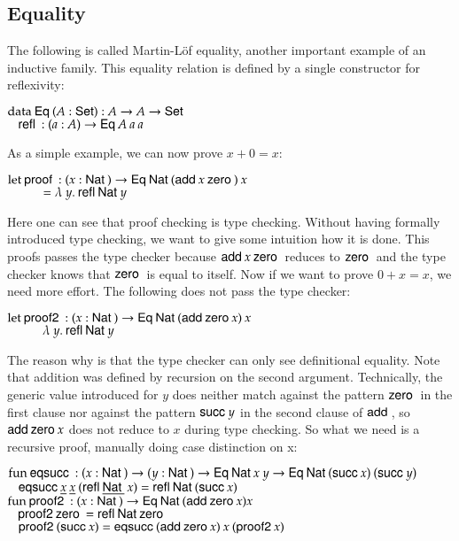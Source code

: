 \subsection{Equality}
The following is called Martin-L\"of equality, another important example of an inductive family.
This equality relation is defined by a single constructor for reflexivity:
\begin{bsp}
$\mathrm{data}\: \mathsf{Eq}\: ( A : \mathsf{Set} ) : A \rightarrow A \rightarrow \mathsf{Set} $ \\
$\hspace*{3mm} \mathsf{refl}\: : ( a : A ) \rightarrow{\mathsf{Eq}\:A \: a \: a}$
\end{bsp}
As a simple example, we can now prove $ x + 0 = x $:
\begin{bsp}
$ \mathrm{let}\: \mathsf{proof}\: : ( x : \mathsf{Nat}\: ) \rightarrow{\mathsf{Eq}\:\mathsf{Nat}\:(\mathsf{add}\:x \: \mathsf{zero}\:)\: x} $ \\ 
$ \spcx = \lam{y}\refl \Nat y$ 
\end{bsp}
Here one can see that proof checking is type checking.
Without having formally introduced type checking, we want to give some intuition how it is done.
This proofs passes the type checker because $\mathsf{add}\: x \: \mathsf{zero}\:$ reduces to $\mathsf{zero}\:$ and the type checker knows that $\mathsf{zero}\:$ is equal to itself.
Now if we want to prove $ 0 +  x = x $, we need more effort.
The following does not pass the type checker:
\begin{bsp}
$ \mathrm{let}\: \mathsf{proof2}\: : ( x : \mathsf{Nat}\: ) \rightarrow{\mathsf{Eq}\:\mathsf{Nat}\:(\mathsf{add}\:\mathsf{zero}\:x)\: x} $ \\ 
$ \spcx \lam{y} \refl \Nat y$ 
\end{bsp}
The reason why is that the type checker can only see definitional equality.
Note that addition was defined by recursion on the second argument.
Technically, the generic value introduced for $y$ does neither match against the pattern $\mathsf{zero}\:$ in the first clause
nor against the pattern $\mathsf{succ}\: y$ in the second clause of $\mathsf{add}\:$, so $\mathsf{add}\: \mathsf{zero}\: x$ does not reduce to $x$ during type checking.
So what we need is a recursive proof, manually doing case distinction on x:
\begin{bsp}
$\mathrm{fun}\: \mathsf{eqsucc}\: : ( x : \mathsf{Nat}\: ) \rightarrow( y : \mathsf{Nat}\: ) \rightarrow \mathsf{Eq}\: \mathsf{Nat}\: x \: y \rightarrow \mathsf{Eq}\: \mathsf{Nat}\: (\mathsf{succ}\: x) \: (\mathsf{succ}\: y)$ \\
$\hspace*{3mm} \mathsf{eqsucc}\: \underline{x} \: \underline{x} \: (\mathsf{refl}\: \underline{\mathsf{Nat}\:} \: x) = \mathsf{refl}\: \mathsf{Nat}\: (\mathsf{succ}\: x)$
\vs\\
$\mathrm{fun}\: \mathsf{proof2}\: : ( x : \mathsf{Nat}\: ) \rightarrow \mathsf{Eq}\: \mathsf{Nat}\: (\mathsf{add}\: \mathsf{zero}\: x) x$\\
$\hspace*{3mm} \mathsf{proof2}\: \mathsf{zero}\: = \mathsf{refl}\: \mathsf{Nat}\: \mathsf{zero}\:$\\
$\hspace*{3mm} \mathsf{proof2}\: (\mathsf{succ}\: x) = \mathsf{eqsucc}\: (\mathsf{add}\: \mathsf{zero}\: x)\: x \: (\mathsf{proof2}\: x)$
\end{bsp}

